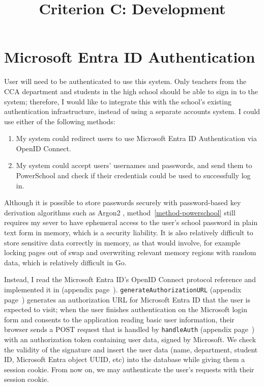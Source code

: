 

\usepackage{nameref}
\usepackage{xr}

\newcommand{\fileref}[1]{\texttt{\nameref*{#1}} (appendix page~\pageref*{#1})}
\newcommand{\coderef}[1]{(appendix page~\pageref*{#1})}
\newcommand{\codenref}[1]{\texttt{#1} (appendix page~\pageref*{#1})}

\title{Criterion C: Development}


\maketitle

\tableofcontents

\section{Microsoft Entra ID Authentication}

User will need to be authenticated to use this system. Only teachers from the CCA department and students in the high school should be able to sign in to the system; therefore, I would like to integrate this with the school's existing authentication infrastructure, instead of using a separate accounts system. I could use either of the following methods:

\begin{enumerate}
	\item \label{method-entra} My system could redirect users to use Microsoft Entra ID Authentication via OpenID Connect.
	\item \label{method-powerschool} My system could accept users' usernames and passwords, and send them to PowerSchool and check if their credentials could be used to successfully log in.
\end{enumerate}

Although it is possible to store passwords securely with password-based key derivation algorithms such as Argon2 \parencite{argon2}, method~\ref{method-powerschool} still requires my sever to have ephemeral access to the user's school password in plain text form in memory, which is a security liability. It is also relatively difficult to store sensitive data correctly in memory, as that would involve, for example locking pages out of swap and overwriting relevant memory regions with random data, which is relatively difficult in Go.

Instead, I read the Microsoft Entra ID's OpenID Connect protocol reference \parencite{ms-oidc} and implemented it in \fileref{endpoint_auth.go}. \codenref{generateAuthorizationURL} generates an authorization URL for Microsoft Entra ID that the user is expected to visit; when the user finishes authentication on the Microsoft login form and consents to the application reading basic user information, their browser sends a POST request that is handled by \codenref{handleAuth} with an authorization token containing user data, signed by Microsoft. We check the validity of the signature and insert the user data (name, department, student ID, Microsoft Entra object UUID, etc) into the database while giving them a session cookie. From now on, we may authenticate the user's requests with their session cookie.

\printbibliography


